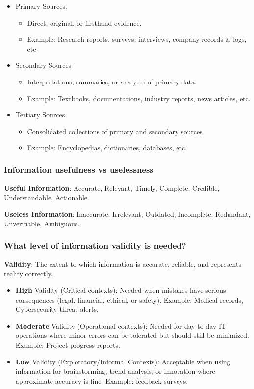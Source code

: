 \begin{itemize}
    \item Primary Sources.
    \begin{itemize}
        \item Direct, original, or firsthand evidence.
        \item Example: Research reports, surveys, interviews, company records \& logs, etc
    \end{itemize}
    \item Secondary Sources
    \begin{itemize}
        \item Interpretations, summaries, or analyses of primary data.
        \item Example: Textbooks, documentations, industry reports, news articles, etc.
    \end{itemize}
    \item Tertiary Sources
    \begin{itemize}
        \item Consolidated collections of primary and secondary sources.
        \item Example: Encyclopedias, dictionaries, databases, etc.
    \end{itemize}
\end{itemize}

\subsubsection{Information usefulness vs uselessness}

\indent

\noindent\textbf{Useful Information}: Accurate, Relevant, Timely, Complete, Credible, Understandable, Actionable.

\noindent\textbf{Useless Information}: Inaccurate, Irrelevant, Outdated, Incomplete, Redundant, Unverifiable, Ambiguous.

\subsubsection{What level of information validity is needed?}

\indent

\noindent\textbf{Validity}: The extent to which information is accurate, reliable, and 
represents reality correctly.

\begin{itemize}
    \item \textbf{High} Validity (Critical contexts): Needed when mistakes have serious consequences (legal, financial, ethical, or safety). Example: Medical records, Cybersecurity threat alerts.
    \item \textbf{Moderate} Validity (Operational contexts): Needed for day-to-day IT operations where minor errors can be tolerated but should still be minimized. Example: Project progress reports.
    \item \textbf{Low} Validity (Exploratory/Informal Contexts): Acceptable when using information for brainstorming, trend analysis, or innovation where approximate accuracy is fine. Example: feedback surveys.
\end{itemize}

